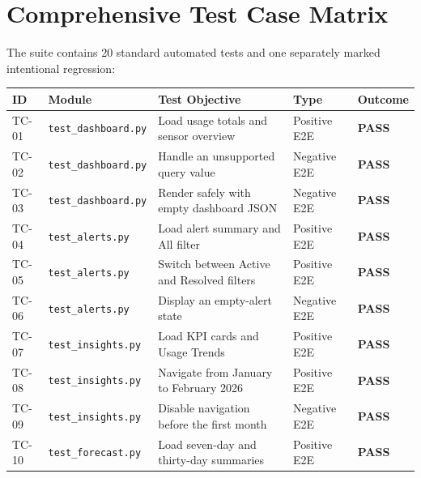 \documentclass[11pt,a4paper]{article}
\begin{document}
\section{Comprehensive Test Case Matrix}

The suite contains 20 standard automated tests and one separately marked intentional regression:

\begin{table}[H]
\centering
\scriptsize
\begin{tabularx}{\linewidth}{@{}l l X l l@{}}
\toprule
\textbf{ID} & \textbf{Module} & \textbf{Test Objective} & \textbf{Type} & \textbf{Outcome} \\
\midrule
\rowcolor{lightgray}
TC-01 & \texttt{test\_dashboard.py} & Load usage totals and sensor overview & Positive E2E & \textcolor{passgreen}{\textbf{PASS}} \\
TC-02 & \texttt{test\_dashboard.py} & Handle an unsupported query value & Negative E2E & \textcolor{passgreen}{\textbf{PASS}} \\
TC-03 & \texttt{test\_dashboard.py} & Render safely with empty dashboard JSON & Negative E2E & \textcolor{passgreen}{\textbf{PASS}} \\
TC-04 & \texttt{test\_alerts.py} & Load alert summary and All filter & Positive E2E & \textcolor{passgreen}{\textbf{PASS}} \\
\rowcolor{lightgray}
TC-05 & \texttt{test\_alerts.py} & Switch between Active and Resolved filters & Positive E2E & \textcolor{passgreen}{\textbf{PASS}} \\
TC-06 & \texttt{test\_alerts.py} & Display an empty-alert state & Negative E2E & \textcolor{passgreen}{\textbf{PASS}} \\
TC-07 & \texttt{test\_insights.py} & Load KPI cards and Usage Trends & Positive E2E & \textcolor{passgreen}{\textbf{PASS}} \\
\rowcolor{lightgray}
TC-08 & \texttt{test\_insights.py} & Navigate from January to February 2026 & Positive E2E & \textcolor{passgreen}{\textbf{PASS}} \\
TC-09 & \texttt{test\_insights.py} & Disable navigation before the first month & Negative E2E & \textcolor{passgreen}{\textbf{PASS}} \\
TC-10 & \texttt{test\_forecast.py} & Load seven-day and thirty-day summaries & Positive E2E & \textcolor{passgreen}{\textbf{PASS}} \\

\end{tabularx}
\end{table}
\end{document}
